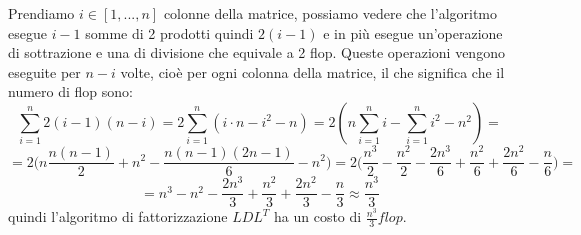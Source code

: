\begin{flushleft}
Prendiamo $i \in [1,...,n]$ colonne della matrice, possiamo vedere che l'algoritmo esegue $i-1$ somme di 2 prodotti quindi $2(i-1)$ e in più esegue un'operazione di sottrazione e una di divisione che equivale a 2 flop. Queste operazioni vengono eseguite per $n-i$ volte, cioè per ogni colonna della matrice, il che significa che il numero di flop sono:
\[
\sum_{i=1}^{n} 2(i-1)(n-i) = 2\sum_{i=1}^{n} (i\cdot n - i^2 - n) = 2(n\sum_{i=1}^{n}i -\sum_{i=1}^{n} i^2 - n^2) =
\]
\[
= 2\Big(n\frac{n(n-1)}{2}+n^2-\frac{n(n-1)(2n-1)}{6}-n^2\Big) = 2\Big(\frac{n^3}{2} -\frac{n^2}{2} - \frac{2n^3}{6} + \frac{n^2}{6} + \frac{2n^2}{6} - \frac{n}{6}\Big) =
\]
\[
= n^3 - n^2 - \frac{2n^3}{3} + \frac{n^2}{3} + \frac{2n^2}{3} - \frac{n}{3} \approx \frac{n^3}{3}
\]
quindi l'algoritmo di fattorizzazione $LDL^T$ ha un costo di $\frac{n^3}{3} flop$.
\end{flushleft}